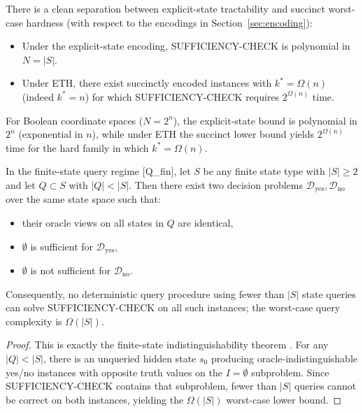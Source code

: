 \begin{corollary}
There is a clean separation between explicit-state tractability and succinct worst-case hardness (with respect to the encodings in Section~\ref{sec:encoding}):
\begin{itemize}
\item Under the explicit-state encoding, SUFFICIENCY-CHECK is polynomial in $N=|S|$.
\item Under ETH, there exist succinctly encoded instances with $k^* = \Omega(n)$ (indeed $k^*=n$) for which SUFFICIENCY-CHECK requires $2^{\Omega(n)}$ time.
\end{itemize}
For Boolean coordinate spaces ($N = 2^n$), the explicit-state bound is polynomial in $2^n$ (exponential in $n$), while under ETH the succinct lower bound yields $2^{\Omega(n)}$ time for the hard family in which $k^* = \Omega(n)$.
\end{corollary}

\begin{proposition}\label{prop:query-regime-obstruction}
In the finite-state query regime [Q\_fin], let $S$ be any finite state type with $|S|\ge 2$ and let $Q\subset S$ with $|Q|<|S|$.
Then there exist two decision problems $\mathcal{D}_{\mathrm{yes}},\mathcal{D}_{\mathrm{no}}$ over the same state space such that:
\begin{itemize}
\item their oracle views on all states in $Q$ are identical,
\item $\emptyset$ is sufficient for $\mathcal{D}_{\mathrm{yes}}$,
\item $\emptyset$ is not sufficient for $\mathcal{D}_{\mathrm{no}}$.
\end{itemize}
Consequently, no deterministic query procedure using fewer than $|S|$ state queries can solve SUFFICIENCY-CHECK on all such instances; the worst-case query complexity is $\Omega(|S|)$.
\end{proposition}

\begin{proof}
This is exactly the finite-state indistinguishability theorem
. For any $|Q|<|S|$, there is an unqueried hidden state $s_0$ producing oracle-indistinguishable yes/no instances with opposite truth values on the $I=\emptyset$ subproblem. Since SUFFICIENCY-CHECK contains that subproblem, fewer than $|S|$ queries cannot be correct on both instances, yielding the $\Omega(|S|)$ worst-case lower bound.
\end{proof}

